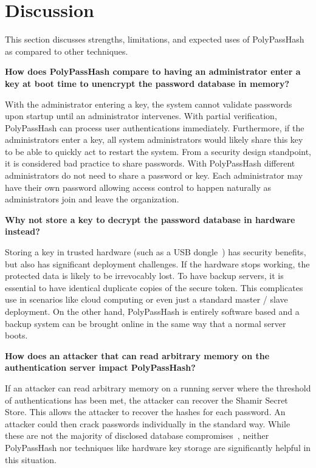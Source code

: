 \section{Discussion}
\label{sec-expecteduse}

This section discusses strengths, limitations, and expected uses of 
PolyPassHash as compared to other techniques.


{\bf How does PolyPassHash compare to having an administrator enter a key
at boot time to unencrypt the password database in memory?}

With the administrator entering a key, the system cannot validate passwords 
upon startup until an administrator intervenes.  With partial verification, 
PolyPassHash can process user authentications immediately.   Furthermore, 
if the administrators enter a key, all system administrators would likely 
share this key to be able to quickly act to restart the system.   From 
a security design standpoint, it is considered bad practice to share
passwords.  With 
PolyPassHash different administrators do not need to share a password or key.
Each administrator may have their own password allowing access control to 
happen naturally as administrators join and leave the organization.


{\bf Why not store a key to decrypt the password database in hardware instead?}

Storing a key in trusted hardware (such as a USB 
dongle~\cite{passwordhardwaredongle}) has security benefits,
but also has significant deployment challenges.  
If the hardware stops working, the protected data is 
likely to be irrevocably lost.  %
To have backup servers, it is essential to have identical 
duplicate copies of the secure token.   This complicates use in scenarios 
like cloud computing or even just a standard master / slave deployment.
On the other hand, PolyPassHash is entirely software based and a backup system
can be brought online in the same way that a normal server boots.

{\bf How does an attacker that can read arbitrary memory on the 
authentication server impact PolyPassHash?}

If an attacker can read arbitrary memory on a running server where the 
threshold of authentications has been met, the attacker can recover
the Shamir Secret Store.   This allows the attacker to recover the 
hashes for each password.   An attacker could then crack passwords
individually in the standard way.    While these are not the majority of
disclosed database compromises~\cite{passwordresearchblog,miranteTR13}, 
neither PolyPassHash nor techniques like hardware key storage 
are significantly helpful in this situation.

